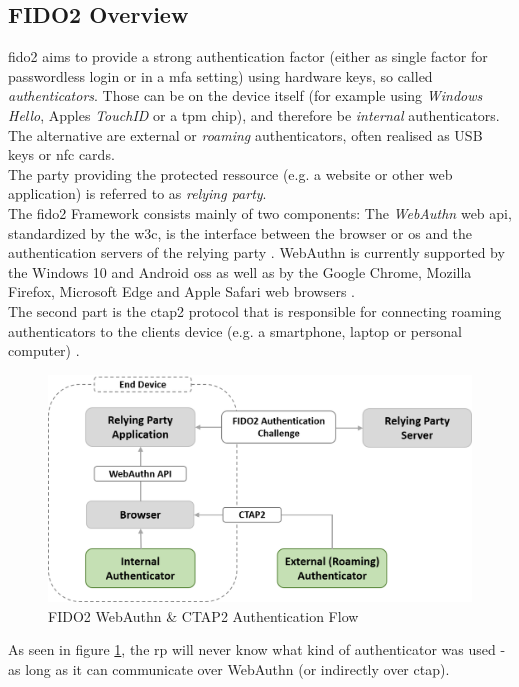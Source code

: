 


\subsection{FIDO2 Overview}
\label{subsec:fido2_webauthn}

\ac{fido2} aims to provide a strong authentication factor (either as single factor for passwordless login or in a \ac{mfa} setting) using hardware keys, so called \emph{authenticators}. Those can be on the device itself (for example using \emph{Windows Hello}, Apples \emph{TouchID} or a \ac{tpm} chip), and therefore be \emph{internal} authenticators. The alternative are external or \emph{roaming} authenticators, often realised as USB keys or \ac{nfc} cards.\\
The party providing the protected ressource (e.g. a website or other web application) is referred to as \emph{relying party}.\\
The \ac{fido2} Framework consists mainly of two components: The \emph{WebAuthn} web \ac{api}, standardized by the \ac{w3c}, is the interface between the browser or \ac{os} and the authentication servers of the relying party \cite{webauthn_standard}. WebAuthn is currently supported by the Windows 10 and Android \acp{os} as well as by the Google Chrome, Mozilla Firefox, Microsoft Edge and Apple Safari web browsers \cite{fido2_webauthn}.\\
The second part is the \ac{ctap2} protocol that is responsible for connecting roaming authenticators to the clients device (e.g. a smartphone, laptop or personal computer) \cite{fido2_overview,fido2_ctap}.\\

\begin{figure}[ht]
    \centering
    \includegraphics[width=1.8\columnwidth]{Figures/fido2_webauth_ctap_flow.png}
    \caption[FIDO2 Authentication Flow]{FIDO2 WebAuthn \& CTAP2 Authentication Flow}
    \label{fig:fido2_webauth_ctap_flow}
\end{figure}

As seen in figure \ref{fig:fido2_webauth_ctap_flow}, the \ac{rp} will never know what kind of authenticator was used - as long as it can communicate over WebAuthn (or indirectly over \ac{ctap}).